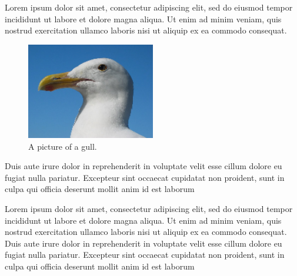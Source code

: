 Lorem ipsum dolor sit amet, consectetur adipiscing elit, sed do eiusmod tempor incididunt ut labore et dolore magna aliqua. Ut enim ad minim veniam, quis nostrud exercitation ullamco laboris nisi ut aliquip ex ea commodo consequat. 
\begin{figure}[H]
  \centering
  \includegraphics[width=0.5\textwidth]{images/gull.png}
  \caption{A picture of a gull.}
\end{figure}
Duis aute irure dolor in reprehenderit in voluptate velit esse cillum dolore eu fugiat nulla pariatur. Excepteur sint occaecat cupidatat non proident, sunt in culpa qui officia deserunt mollit anim id est laborum

Lorem ipsum dolor sit amet, consectetur adipiscing elit, sed do eiusmod tempor incididunt ut labore et dolore magna aliqua. Ut enim ad minim veniam, quis nostrud exercitation ullamco laboris nisi ut aliquip ex ea commodo consequat. Duis aute irure dolor in reprehenderit in voluptate velit esse cillum dolore eu fugiat nulla pariatur. Excepteur sint occaecat cupidatat non proident, sunt in culpa qui officia deserunt mollit anim id est laborum


